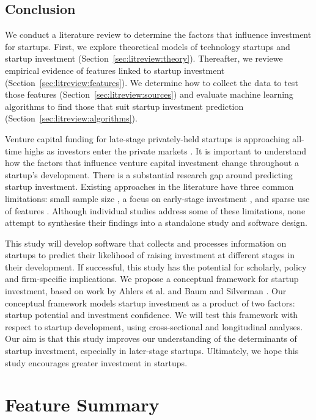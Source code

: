 \documentclass[../thesis/thesis.tex]{subfiles}
\begin{document}
\begin{refsection}
\section{Conclusion}
\label{sec:litreview:conclusion}


We conduct a literature review to determine the factors that influence investment for startups. First, we explore theoretical models of technology startups and startup investment (Section~\ref{sec:litreview:theory}). Thereafter, we reviewe empirical evidence of features linked to startup investment (Section~\ref{sec:litreview:features}). We determine how to collect the data to test those features (Section~\ref{sec:litreview:sources}) and evaluate machine learning algorithms to find those that suit startup investment prediction (Section~\ref{sec:litreview:algorithms}).


Venture capital funding for late-stage privately-held startups is approaching all-time highs as investors enter the private markets \cite{nvca2016}. It is important to understand how the factors that influence venture capital investment change throughout a startup's development. There is a substantial research gap around predicting startup investment. Existing approaches in the literature have three common limitations: small sample size \cite{ahlers2015, gimmon2010, dixon2014, hoenen2014, yu2015, an2015, werth2013, croce2016}, a focus on early-stage investment \cite{beckwith2016, ahlers2015, cheng2016, yuan2016, croce2016}, and sparse use of features \cite{ahlers2015, an2015, cheng2016, croce2016, werth2013, gimmon2010}. Although individual studies address some of these limitations, none attempt to synthesise their findings into a standalone study and software design.


This study will develop software that collects and processes information on startups to predict their likelihood of raising investment at different stages in their development. If successful, this study has the potential for scholarly, policy and firm-specific implications. We propose a conceptual framework for startup investment, based on work by Ahlers et al. \cite{ahlers2015} and Baum and Silverman \cite{baum2004}. Our conceptual framework models startup investment as a product of two factors: startup potential and investment confidence. We will test this framework with respect to startup development, using cross-sectional and longitudinal analyses. Our aim is that this study improves our understanding of the determinants of startup investment, especially in later-stage startups. Ultimately, we hope this study encourages greater investment in startups.

\appendix

\chapter{Feature Summary}
\label{chap:appendix:feature_summary}


\printbibliography
\end{refsection}
\end{document}
